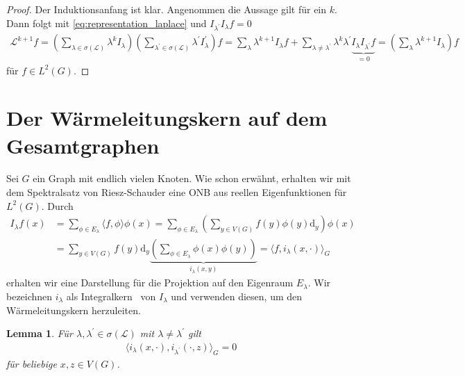 \documentclass[headsepline,11pt]{scrbook}
\newtheorem{lem}{Lemma}[section]
\theoremstyle{definition}
\begin{document}
\begin{proof}
	Der Induktionsanfang ist klar. 
	Angenommen die Aussage gilt f\"ur ein $ k $.
	Dann folgt mit \eqref{eq:representation_laplace} und $ I_{\lambda^\prime} I_\lambda  f  = 0 $ 
	\begin{align*}
	\mathcal{L}^{k+1} f
	= 
	\left( \sum \limits_{\lambda \in \sigma(\mathcal{L})} \lambda^k I_\lambda \right)
	\left( \sum \limits_{\lambda^\prime \in \sigma(\mathcal{L})} \lambda^\prime  I_\lambda^\prime \right) f
	=
	\sum \limits_{\lambda} \lambda^{k+1} I_\lambda f +
	\sum \limits_{\lambda \neq \lambda^\prime} 
	\lambda^k \lambda^\prime 
	\underbrace{I_\lambda I_{\lambda^\prime } f}_{=0}
	=
	\left(\sum \limits_{\lambda} \lambda^{k+1} I_\lambda \right) f
	\end{align*}
	f\"ur $ f \in L^2(G) $.
\end{proof}



\section{Der W\"armeleitungskern auf dem Gesamtgraphen }
Sei $ G  $ ein Graph mit endlich vielen Knoten.
Wie schon erw\"ahnt, erhalten wir mit dem Spektralsatz von Riesz-Schauder
eine ONB aus reellen Eigenfunktionen f\"ur $ L^2(G) $.
Durch
\begin{equation}
\begin{split}\label{eq:kernel_projection}
I_\lambda f(x) &=
\sum \limits_{\phi \in E_\lambda} \langle f , \phi \rangle \phi(x)
=
\sum \limits_{\phi \in E_\lambda} 
\left(\sum \limits_{y \in V(G)} 
f(y) \phi(y)  \mathrm{d}_y\right) \phi(x)\\
&=
\sum \limits_{y \in V(G)} f(y) \mathrm{d}_y  
\underbrace{\left(\sum \limits_{\phi \in E_\lambda} \phi(x) \phi(y)\right) }_{i_\lambda(x,y)}
=
\langle f, i_\lambda(x,\cdot) \rangle_G
\end{split}
\end{equation}
erhalten wir eine Darstellung f\"ur die Projektion auf den Eigenraum $ E_\lambda $. 
Wir bezeichnen $ i_\lambda $ als \glqq Integralkern\grqq~ von $ I_\lambda $ und verwenden diesen, um den W\"armeleitungskern herzuleiten.

\begin{lem}\label{th:projection_kernel_different_eigenvalues}
	F\"ur $ \lambda, \lambda^\prime \in \sigma(\mathcal{L}) $ mit $ \lambda \neq \lambda^\prime $ gilt
	\begin{align}\label{eq:projection_kernel_different_eigenvalues}
	\langle i_\lambda(x,\cdot), i_{\lambda^\prime}(\cdot,z) \rangle_G
	=0
	\end{align}
	f\"ur beliebige  $ x,z \in V(G) $.
\end{lem}
\end{document}
